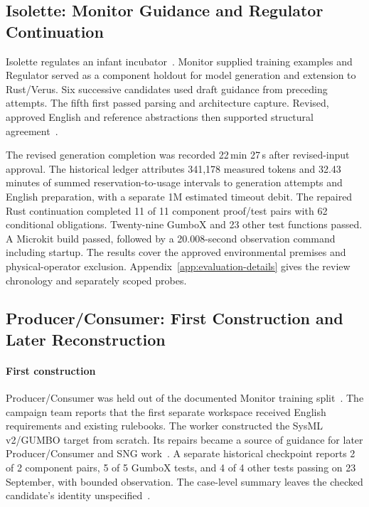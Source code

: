 \subsection{Isolette: Monitor Guidance and Regulator Continuation}
Isolette regulates an infant incubator~\cite{hatcliff2024isolette}. Monitor supplied training examples and Regulator served as a component holdout for model generation and extension to Rust/Verus. Six successive candidates used draft guidance from preceding attempts. The fifth first passed parsing and architecture capture. Revised, approved English and reference abstractions then supported structural agreement~\cite{isoletteConsolidatedReport2026}.

The revised generation completion was recorded 22\,min 27\,s after revised-input approval. The historical ledger attributes 341,178 measured tokens and 32.43 minutes of summed reservation-to-usage intervals to generation attempts and English preparation, with a separate 1M estimated timeout debit. The repaired Rust continuation completed 11 of 11 component proof/test pairs with 62 conditional obligations. Twenty-nine GumboX and 23 other test functions passed. A Microkit build passed, followed by a 20.008-second observation command including startup. The results cover the approved environmental premises and physical-operator exclusion. Appendix~\ref{app:evaluation-details} gives the review chronology and separately scoped probes.

\subsection{Producer/Consumer: First Construction and Later Reconstruction}
\label{sec:reuse-evaluation}
\paragraph{First construction}
Producer/\allowbreak{}Consumer was held out of the documented Monitor training split~\cite{scpCheckpoint}. The campaign team reports that the first separate workspace received English requirements and existing rulebooks. The worker constructed the SysML v2/GUMBO target from scratch. Its repairs became a source of guidance for later Producer/\allowbreak{}Consumer and SNG work~\cite{producerConsumerConsolidatedReport2026}. A separate historical checkpoint reports 2 of 2 component pairs, 5 of 5 GumboX tests, and 4 of 4 other tests passing on 23 September, with bounded observation. The case-level summary leaves the checked candidate's identity unspecified~\cite{checkpointResults}.

